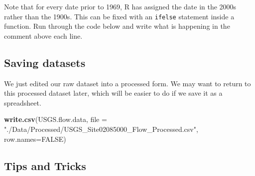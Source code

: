 \documentclass[]{article}
\newenvironment{Shaded}{\begin{snugshade}}{\end{snugshade}}
\newcommand{\CommentTok}[1]{\textcolor[rgb]{0.56,0.35,0.01}{\textit{#1}}}
\newcommand{\ControlFlowTok}[1]{\textcolor[rgb]{0.13,0.29,0.53}{\textbf{#1}}}
\newcommand{\DataTypeTok}[1]{\textcolor[rgb]{0.13,0.29,0.53}{#1}}
\newcommand{\DecValTok}[1]{\textcolor[rgb]{0.00,0.00,0.81}{#1}}
\newcommand{\KeywordTok}[1]{\textcolor[rgb]{0.13,0.29,0.53}{\textbf{#1}}}
\newcommand{\NormalTok}[1]{#1}
\newcommand{\OperatorTok}[1]{\textcolor[rgb]{0.81,0.36,0.00}{\textbf{#1}}}
\newcommand{\OtherTok}[1]{\textcolor[rgb]{0.56,0.35,0.01}{#1}}
\newcommand{\StringTok}[1]{\textcolor[rgb]{0.31,0.60,0.02}{#1}}
\begin{document}
Note that for every date prior to 1969, R has assigned the date in the
2000s rather than the 1900s. This can be fixed with an \texttt{ifelse}
statement inside a function. Run through the code below and write what
is happening in the comment above each line.

\begin{Shaded}
\end{Shaded}

\hypertarget{saving-datasets}{%
\subsection{Saving datasets}\label{saving-datasets}}

We just edited our raw dataset into a processed form. We may want to
return to this processed dataset later, which will be easier to do if we
save it as a spreadsheet.

\begin{Shaded}
\begin{Highlighting}[]
\KeywordTok{write.csv}\NormalTok{(USGS.flow.data, }\DataTypeTok{file =} \StringTok{"./Data/Processed/USGS_Site02085000_Flow_Processed.csv"}\NormalTok{, }\DataTypeTok{row.names=}\OtherTok{FALSE}\NormalTok{)}
\end{Highlighting}
\end{Shaded}

\hypertarget{tips-and-tricks}{%
\subsection{Tips and Tricks}\label{tips-and-tricks}}
\end{document}
